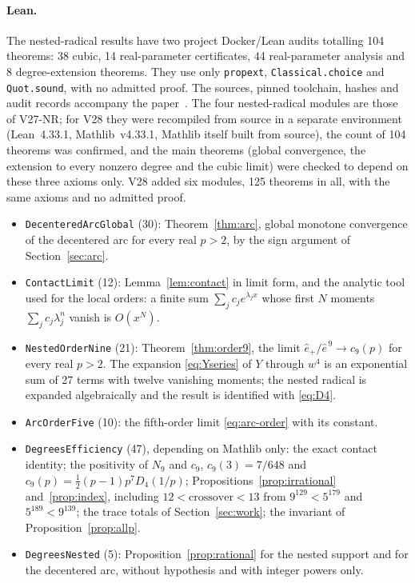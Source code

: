 \paragraph{Lean.}
The nested-radical results have two project Docker/Lean audits totalling 104 theorems: 38 cubic, 14
real-parameter certificates, 44 real-parameter analysis and 8 degree-extension theorems. They use only
\texttt{propext}, \texttt{Classical.choice} and \texttt{Quot.sound}, with no admitted proof. The
sources, pinned toolchain, hashes and audit records accompany the paper~\cite{lean4,mathlib,supplNR}.
The four nested-radical modules are those of V27-NR; for V28 they were recompiled from
source in a separate environment (Lean~4.33.1, Mathlib~v4.33.1, Mathlib itself built from source), the
count of 104 theorems was confirmed, and the main theorems (global convergence, the extension to every
nonzero degree and the cubic limit) were checked to depend on these three axioms only. V28 added six
modules, 125 theorems in all, with the same axioms and no admitted proof.
\begin{itemize}
\item \texttt{DecenteredArcGlobal} (30): Theorem~\ref{thm:arc}, global monotone convergence of the
  decentered arc for every real $p>2$, by the sign argument of Section~\ref{sec:arc}.
\item \texttt{ContactLimit} (12): Lemma~\ref{lem:contact} in limit form, and the analytic tool used for
  the local orders: a finite sum $\sum_jc_je^{\lambda_jx}$ whose first $N$ moments
  $\sum_jc_j\lambda_j^{n}$ vanish is $O(x^{N})$.
\item \texttt{NestedOrderNine} (21): Theorem~\ref{thm:order9}, the limit
  $\hat e_+/\hat e^{\,9}\to c_9(p)$ for every real $p>2$. The expansion \eqref{eq:Yseries} of $Y$
  through $w^{4}$ is an exponential sum of 27 terms with twelve vanishing moments; the nested radical
  is expanded algebraically and the result is identified with \eqref{eq:D4}.
\item \texttt{ArcOrderFive} (10): the fifth-order limit \eqref{eq:arc-order} with its constant.
\item \texttt{DegreesEfficiency} (47), depending on Mathlib only: the exact contact identity; the
  positivity of $N_9$ and $c_9$, $c_9(3)=7/648$ and $c_9(p)=\tfrac12(p-1)p^{7}D_4(1/p)$;
  Propositions~\ref{prop:irrational} and~\ref{prop:index}, including $12<\text{crossover}<13$ from
  $9^{129}<5^{179}$ and $5^{189}<9^{139}$; the trace totals of Section~\ref{sec:work}; the invariant of
  Proposition~\ref{prop:allp}.
\item \texttt{DegreesNested} (5): Proposition~\ref{prop:rational} for the nested support and for the
  decentered arc, without hypothesis and with integer powers only.
\end{itemize}
